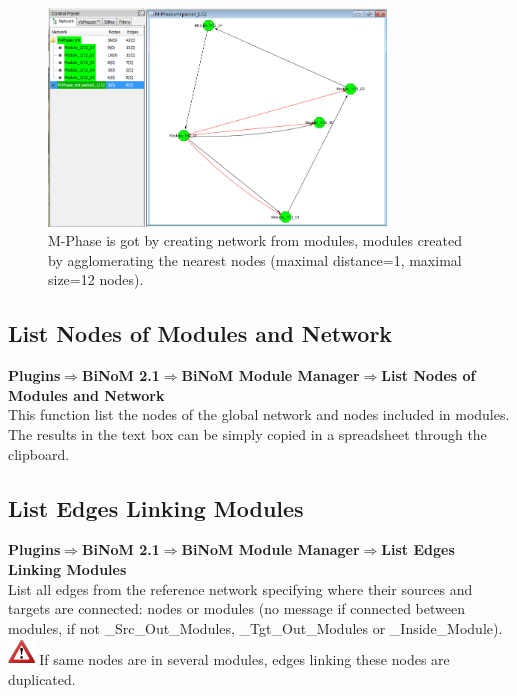 \begin{figure}
\centering
\includegraphics[width=0.8\textwidth]{graphics/M-Phase_packed}
\caption{M-Phase is got by creating network from modules, modules created by agglomerating the nearest nodes (maximal distance=1, maximal size=12 nodes).}
\label{M-Phase_packed}
\end{figure}

\subsection{List Nodes of Modules and Network}
\textbf{Plugins$\Rightarrow$BiNoM 2.1$\Rightarrow$BiNoM Module Manager$\Rightarrow$List Nodes of Modules and Network}\\
This function list the nodes of the global network and nodes included in modules.\\
The results in the text box can be simply copied in a spreadsheet through the clipboard.

\subsection{List Edges Linking Modules}
\textbf{Plugins$\Rightarrow$BiNoM 2.1$\Rightarrow$BiNoM Module Manager$\Rightarrow$List Edges Linking Modules}\\
List all edges from the reference network specifying where their sources and targets are connected: nodes or modules (no message if connected between modules, if not \_Src\_Out\_Modules, \_Tgt\_Out\_Modules or \_Inside\_Module).\\
\includegraphics[width=20pt,height=20pt]{graphics/warning}  If same nodes are in several modules, edges linking these nodes are duplicated.

